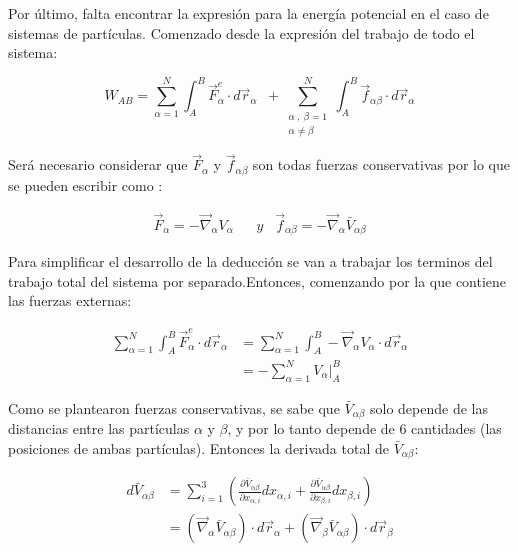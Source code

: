 \documentclass[/home/hernan/Documentos/Apuntes_mecanica_teorica/main.tex]{subfiles}
\begin{document}
	Por último, falta encontrar la expresión para la energía potencial en el caso de sistemas de partículas. Comenzado desde la expresión del trabajo de todo el sistema:

	\begin{equation*}
		W_{AB} = \sum_{\alpha = 1}^{N} \int_{A}^{B} \vec{F}_{\alpha}^{e} \cdot d\vec{r}_{\alpha} \; \; + \sum_{\left . \begin{matrix} \alpha \: , \: \beta = 1\\ \alpha \neq \beta \end{matrix} \right .}^{N} \int_{A}^{B} \vec{f}_{\alpha \beta} \cdot d\vec{r}_{\alpha}
	\end{equation*}

	Será necesario considerar que $\vec{F}_{\alpha}$ y $\vec{f}_{\alpha \beta}$ son todas fuerzas conservativas por lo que se pueden escribir como :

	\begin{align*}
		\vec{F}_{\alpha} = -\vec{\nabla}_{\alpha} V_{\alpha} \; \; \; & y \; \; \; \vec{f}_{\alpha \beta} = -\vec{\nabla}_{\alpha} \bar{V}_{\alpha \beta}
	\end{align*}

	Para simplificar el desarrollo de la deducción se van a trabajar los terminos del trabajo total del sistema por separado.Entonces, comenzando por la que contiene las fuerzas externas:

	\begin{align*}
		\sum_{\alpha = 1}^{N} \int_{A}^{B} \vec{F}_{\alpha}^{e} \cdot d\vec{r}_{\alpha} & = \sum_{\alpha = 1}^{N} \int_{A}^{B} -\vec{\nabla}_{\alpha} V_{\alpha} \cdot d\vec{r}_{\alpha} \\ 
		& = - \sum_{\alpha = 1}^{N} \left .V_{\alpha} \right|_{A}^{B}
	\end{align*}

	Como se plantearon fuerzas conservativas, se sabe que $\bar{V}_{\alpha \beta}$ solo depende de las distancias entre las partículas $\alpha$ y $\beta$, y por lo tanto depende de 6 cantidades (las posiciones de ambas partículas). Entonces la derivada total de  $\bar{V}_{\alpha \beta}$: 

	\begin{align*}
		d\bar{V}_{\alpha \beta} & = \sum_{i=1}^{3} \left(\frac{\partial \bar{V}_{\alpha \beta}}{\partial x_{\alpha,i}} dx_{\alpha,i} + \frac{\partial \bar{V}_{\alpha \beta}}{\partial x_{\beta,i}}dx_{\beta,i}\right) \\ 
		& = \left(\vec{\nabla}_{\alpha} \bar{V}_{\alpha \beta} \right) \cdot d\vec{r}_{\alpha} +\left(\vec{\nabla}_{\beta} \bar{V}_{\alpha \beta} \right) \cdot d\vec{r}_{\beta}
	\end{align*}
\end{document}
